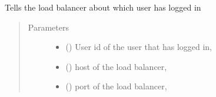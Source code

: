 \documentclass[letterpaper,10pt,english]{sphinxmanual}
\begin{document}
\begin{fulllineitems}
\label{\detokenize{startServer:startServer.send_lb_new_login_info}}
Tells the load balancer about which user has logged in
\begin{quote}\begin{description}
\item[{Parameters}] \leavevmode\begin{itemize}
\item {} 
 (\sphinxstyleliteralemphasis{\sphinxupquote{,}}) \textendash{} User id of the user that has logged in,

\item {} 
 (\sphinxstyleliteralemphasis{\sphinxupquote{,}}) \textendash{} host of the load balancer,

\item {} 
 () \textendash{} port of the load balancer,

\end{itemize}

\end{description}\end{quote}

\end{fulllineitems}

\end{document}
